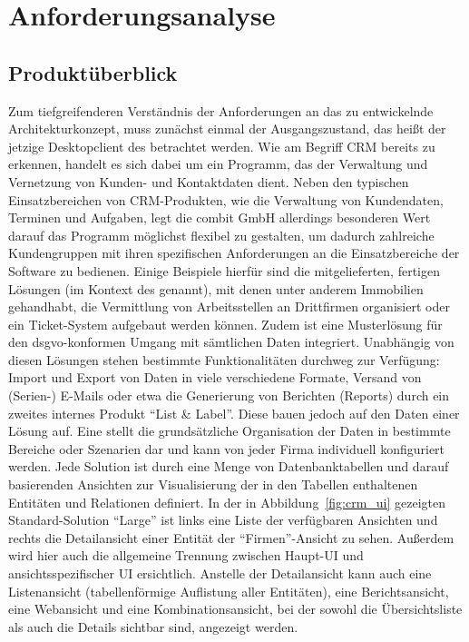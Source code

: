 \chapter{Anforderungsanalyse}\label{chap:requirements}

\section{Produktüberblick}\label{sec:product_overview}
Zum tiefgreifenderen Verständnis der Anforderungen an das zu entwickelnde Architekturkonzept, muss zunächst einmal der Ausgangszustand, das heißt der jetzige Desktopclient des  betrachtet werden. Wie am Begriff \gls{CRM} bereits zu erkennen, handelt es sich dabei um ein Programm, das der Verwaltung und Vernetzung von Kunden- und Kontaktdaten dient. Neben den typischen Einsatzbereichen von \gls{CRM}-Produkten, wie die Verwaltung von Kundendaten, Terminen und Aufgaben, legt die combit GmbH allerdings besonderen Wert darauf das Programm möglichst flexibel zu gestalten, um dadurch zahlreiche Kundengruppen mit ihren spezifischen Anforderungen an die Einsatzbereiche der Software zu bedienen. Einige Beispiele hierfür sind die mitgelieferten, fertigen Lösungen (im Kontext des   genannt), mit denen unter anderem Immobilien gehandhabt, die Vermittlung von Arbeitsstellen an Drittfirmen organisiert oder ein Ticket-System aufgebaut werden können. Zudem ist eine Musterlösung für den \gls{dsgvo}-konformen Umgang mit sämtlichen Daten integriert. Unabhängig von diesen Lösungen stehen bestimmte Funktionalitäten durchweg zur Verfügung: Import und Export von Daten in viele verschiedene Formate, Versand von (Serien-) E-Mails oder etwa die Generierung von Berichten (Reports) durch ein zweites internes Produkt ``List \& Label''. Diese bauen jedoch auf den Daten einer Lösung auf.
Eine  stellt die grundsätzliche Organisation der Daten in bestimmte Bereiche oder Szenarien dar und kann von jeder Firma individuell konfiguriert werden. Jede Solution ist durch eine Menge von Datenbanktabellen und darauf basierenden Ansichten zur Visualisierung der in den Tabellen enthaltenen Entitäten und Relationen definiert. In der in Abbildung~\ref{fig:crm_ui} gezeigten Standard-Solution ``Large'' ist links eine Liste der verfügbaren Ansichten und rechts die Detailansicht einer Entität der ``Firmen''-Ansicht zu sehen. Außerdem wird hier auch die allgemeine Trennung zwischen Haupt-UI und ansichtsspezifischer UI ersichtlich. Anstelle der Detailansicht kann auch eine Listenansicht (tabellenförmige Auflistung aller Entitäten), eine Berichtsansicht, eine Webansicht und eine Kombinationsansicht, bei der sowohl die Übersichtsliste als auch die Details sichtbar sind, angezeigt werden.

